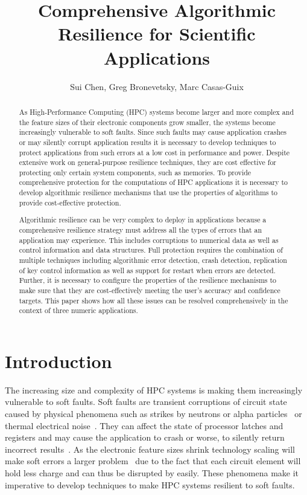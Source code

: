 \documentclass{sig-alternate}
\title{Comprehensive Algorithmic Resilience for Scientific Applications}
\author{Sui Chen, 
Greg Bronevetsky, Marc Casas-Guix
}
\begin{document}
\maketitle

\begin{abstract}
As High-Performance Computing (HPC) systems become larger and more complex and the feature sizes of their electronic components grow smaller, the systems become increasingly vulnerable to soft faults.
Since such faults may cause application crashes or may silently corrupt application results it is necessary to develop techniques to protect applications from such errors at a low cost in performance and power.
Despite extensive work on general-purpose resilience techniques, they are cost effective for protecting only certain system components, such as memories.
To provide comprehensive protection for the computations of HPC applications it is necessary to develop algorithmic resilience mechanisms that use the properties of algorithms to provide cost-effective protection.

Algorithmic resilience can be very complex to deploy in applications because a comprehensive resilience strategy must address all the types of errors that an application may experience.
This includes corruptions to numerical data as well as control information and data structures.
Full protection requires the combination of multiple techniques including algorithmic error detection, crash detection, replication of key control information as well as support for restart when errors are detected.
Further, it is necessary to configure the properties of the resilience mechanisms to make sure that they are cost-effectively meeting the user's accuracy and confidence targets.
This paper shows how all these issues can be resolved comprehensively in the context of three numeric applications.

\end{abstract}

\section{Introduction}
\label{sec:intro}

The increasing size and complexity of HPC systems is making them increasingly vulnerable to soft faults.
Soft faults are transient corruptions of circuit state caused by physical phenomena such as strikes by neutrons or alpha particles~\cite{baumann:2005, asciQSER:2005} or thermal electrical noise~\cite{therm_noise:2007}.
They can affect the state of processor latches and registers and may cause the application to crash or worse, to silently return incorrect results~\cite{mpi_ser:reed:2004}.
As the electronic feature sizes shrink technology scaling will make soft errors a larger problem~\cite{err_scaling:2012} due to the fact that each circuit element will hold less charge and can thus be disrupted by easily.
These phenomena make it imperative to develop techniques to make HPC systems resilient to soft faults.
\end{document}
